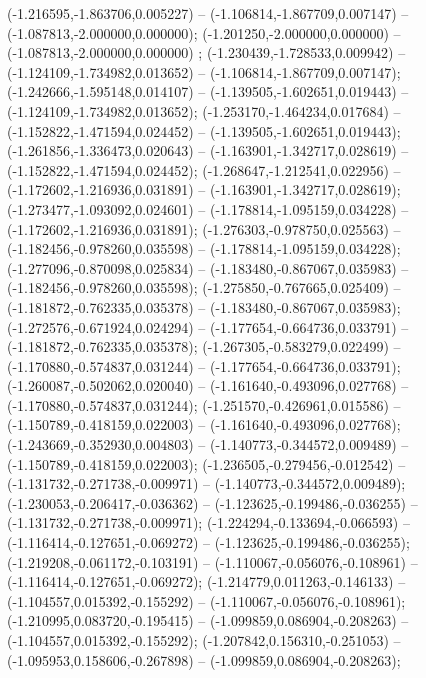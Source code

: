  (-1.216595,-1.863706,0.005227) -- (-1.106814,-1.867709,0.007147) -- (-1.087813,-2.000000,0.000000);
 (-1.201250,-2.000000,0.000000) -- (-1.087813,-2.000000,0.000000) ;
 (-1.230439,-1.728533,0.009942) -- (-1.124109,-1.734982,0.013652) -- (-1.106814,-1.867709,0.007147);
 (-1.242666,-1.595148,0.014107) -- (-1.139505,-1.602651,0.019443) -- (-1.124109,-1.734982,0.013652);
 (-1.253170,-1.464234,0.017684) -- (-1.152822,-1.471594,0.024452) -- (-1.139505,-1.602651,0.019443);
 (-1.261856,-1.336473,0.020643) -- (-1.163901,-1.342717,0.028619) -- (-1.152822,-1.471594,0.024452);
 (-1.268647,-1.212541,0.022956) -- (-1.172602,-1.216936,0.031891) -- (-1.163901,-1.342717,0.028619);
 (-1.273477,-1.093092,0.024601) -- (-1.178814,-1.095159,0.034228) -- (-1.172602,-1.216936,0.031891);
 (-1.276303,-0.978750,0.025563) -- (-1.182456,-0.978260,0.035598) -- (-1.178814,-1.095159,0.034228);
 (-1.277096,-0.870098,0.025834) -- (-1.183480,-0.867067,0.035983) -- (-1.182456,-0.978260,0.035598);
 (-1.275850,-0.767665,0.025409) -- (-1.181872,-0.762335,0.035378) -- (-1.183480,-0.867067,0.035983);
 (-1.272576,-0.671924,0.024294) -- (-1.177654,-0.664736,0.033791) -- (-1.181872,-0.762335,0.035378);
 (-1.267305,-0.583279,0.022499) -- (-1.170880,-0.574837,0.031244) -- (-1.177654,-0.664736,0.033791);
 (-1.260087,-0.502062,0.020040) -- (-1.161640,-0.493096,0.027768) -- (-1.170880,-0.574837,0.031244);
 (-1.251570,-0.426961,0.015586) -- (-1.150789,-0.418159,0.022003) -- (-1.161640,-0.493096,0.027768);
 (-1.243669,-0.352930,0.004803) -- (-1.140773,-0.344572,0.009489) -- (-1.150789,-0.418159,0.022003);
 (-1.236505,-0.279456,-0.012542) -- (-1.131732,-0.271738,-0.009971) -- (-1.140773,-0.344572,0.009489);
 (-1.230053,-0.206417,-0.036362) -- (-1.123625,-0.199486,-0.036255) -- (-1.131732,-0.271738,-0.009971);
 (-1.224294,-0.133694,-0.066593) -- (-1.116414,-0.127651,-0.069272) -- (-1.123625,-0.199486,-0.036255);
 (-1.219208,-0.061172,-0.103191) -- (-1.110067,-0.056076,-0.108961) -- (-1.116414,-0.127651,-0.069272);
 (-1.214779,0.011263,-0.146133) -- (-1.104557,0.015392,-0.155292) -- (-1.110067,-0.056076,-0.108961);
 (-1.210995,0.083720,-0.195415) -- (-1.099859,0.086904,-0.208263) -- (-1.104557,0.015392,-0.155292);
 (-1.207842,0.156310,-0.251053) -- (-1.095953,0.158606,-0.267898) -- (-1.099859,0.086904,-0.208263);
